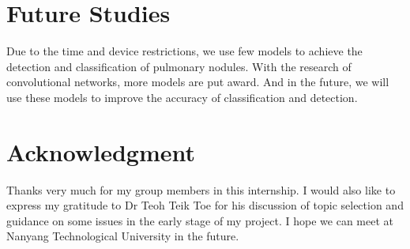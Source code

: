\documentclass[conference]{IEEEtran}
\begin{document}
\section{Future Studies}
Due to the time and device restrictions, we use few models to achieve the detection and classification of pulmonary nodules. With the research of convolutional networks,
more models are put award. And in the future, we will use these models to improve the accuracy of classification and detection.

\section*{Acknowledgment}
Thanks very much for my group members in this internship. I would also like to express my gratitude to Dr Teoh Teik Toe for his discussion of topic selection and guidance on some issues in the early stage of my project. I hope we can meet at Nanyang Technological University in the future.





\end{document}
